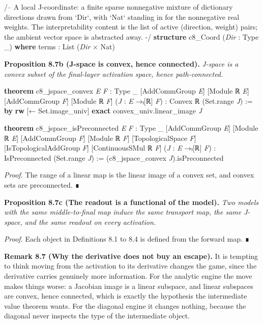 \documentclass{memoir}
\begin{document}
\begin{LeanVerbatim}
/-- A local J-coordinate: a finite sparse nonnegative
    mixture of dictionary directions drawn from `Dir`,
    with `Nat` standing in for the nonnegative real
    weights. The interpretability content is the list
    of active (direction, weight) pairs; the ambient
    vector space is abstracted away. -/
\textbf{structure} c8_Coord (\textit{Dir} : Type _) \textbf{where}
  terms : List (\textit{Dir} × Nat)

\end{LeanVerbatim}


\textbf{Proposition 8.7b (J-space is convex, hence connected).} \emph{J-space is a convex subset
of the final-layer activation space, hence path-connected.}

\begin{LeanVerbatim}
\textbf{theorem} c8_jspace_convex \textit{E} \textit{F} : Type _
    [AddCommGroup \textit{E}] [Module ℝ \textit{E}] [AddCommGroup \textit{F}]
    [Module ℝ \textit{F}]
    (\textit{J} : \textit{E} →ₗ[ℝ] \textit{F}) : Convex ℝ (Set.range \textit{J}) := \textbf{by}
  \textbf{rw} [← Set.image_univ]
  \textbf{exact} convex_univ.linear_image \textit{J}

\textbf{theorem} c8_jspace_isPreconnected \textit{E} \textit{F} : Type _
    [AddCommGroup \textit{E}] [Module ℝ \textit{E}]
    [AddCommGroup \textit{F}] [Module ℝ \textit{F}] [TopologicalSpace \textit{F}]
    [IsTopologicalAddGroup \textit{F}] [ContinuousSMul ℝ \textit{F}]
    (\textit{J} : \textit{E} →ₗ[ℝ] \textit{F}) : IsPreconnected (Set.range \textit{J}) :=
  (c8_jspace_convex \textit{J}).isPreconnected

\end{LeanVerbatim}


\emph{Proof.} The range of a linear map is the linear image of a convex set, and convex
sets are preconnected. ∎

\textbf{Proposition 8.7c (The readout is a functional of the model).} \emph{Two models with the
same middle-to-final map induce the same transport map, the same J-space, and
the same readout on every activation.}

\emph{Proof.} Each object in Definitions 8.1 to 8.4 is defined from the forward map. ∎

\textbf{Remark 8.7 (Why the derivative does not buy an escape).} It is tempting to think
moving from the activation to its derivative changes the game, since the
derivative carries genuinely more information. For the analytic engine the move
makes things worse: a Jacobian image is a linear subspace, and linear subspaces
are convex, hence connected, which is exactly the hypothesis the intermediate
value theorem wants. For the diagonal engine it changes nothing, because the
diagonal never inspects the type of the intermediate object.
\end{document}
